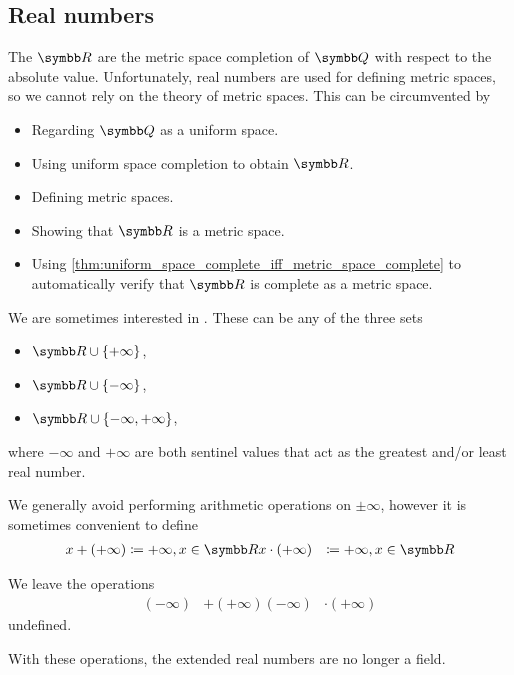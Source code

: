 \subsection{Real numbers}\label{subsec:real_numbers}

\begin{definition}\label{def:real_numbers}
  The  \( \R \) are the metric space completion of \( \Q \) with respect to the absolute value. Unfortunately, real numbers are used for defining metric spaces, so we cannot rely on the theory of metric spaces. This can be circumvented by
  \begin{itemize}
    \item Regarding \( \Q \) as a uniform space.
    \item Using uniform space completion to obtain \( \R \).
    \item Defining metric spaces.
    \item Showing that \( \R \) is a metric space.
    \item Using \cref{thm:uniform_space_complete_iff_metric_space_complete} to automatically verify that \( \R \) is complete as a metric space.
  \end{itemize}
\end{definition}

\begin{definition}\label{def:extended_real_numbers}
  We are sometimes interested in . These can be any of the three sets
  \begin{itemize}
    \item \( \R \cup \{ +\infty \} \),
    \item \( \R \cup \{ -\infty \} \),
    \item \( \R \cup \{ -\infty, +\infty \} \),
  \end{itemize}
  where \( -\infty \) and \( +\infty \) are both sentinel values that act as the greatest and/or least real number.

  We generally avoid performing arithmetic operations on \( \pm \infty \), however it is sometimes convenient to define
  \begin{align*}
    x + (+\infty) &\coloneqq +\infty, x \in \R
    x \cdot (+\infty) &\coloneqq +\infty, x \in \R
  \end{align*}

  We leave the operations
  \begin{align*}
    (-\infty) &+ (+\infty)
    (-\infty) &\cdot (+\infty)
  \end{align*}
  undefined.

  With these operations, the extended real numbers are no longer a field.
\end{definition}

